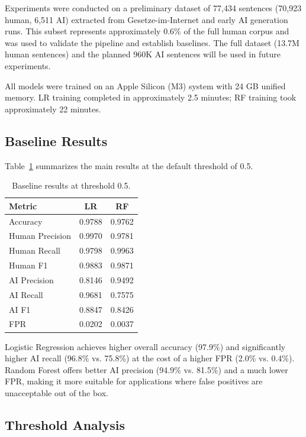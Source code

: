 \documentclass[11pt,a4paper]{article}
\begin{document}
Experiments were conducted on a preliminary dataset of 77,434 sentences (70,923 human, 6,511 AI) extracted from Gesetze-im-Internet and early AI generation runs. This subset represents approximately 0.6\% of the full human corpus and was used to validate the pipeline and establish baselines. The full dataset (13.7M human sentences) and the planned 960K AI sentences will be used in future experiments.

All models were trained on an Apple Silicon (M3) system with 24 GB unified memory. LR training completed in approximately 2.5 minutes; RF training took approximately 22 minutes.

\subsection{Baseline Results}

Table~\ref{tab:results} summarizes the main results at the default threshold of 0.5.

\begin{table}[t]
\centering
\caption{Baseline results at threshold 0.5.}
\label{tab:results}
\begin{tabular}{lcc}
\toprule
Metric & LR & RF \\
\midrule
Accuracy & 0.9788 & 0.9762 \\
Human Precision & 0.9970 & 0.9781 \\
Human Recall & 0.9798 & 0.9963 \\
Human F1 & 0.9883 & 0.9871 \\
AI Precision & 0.8146 & 0.9492 \\
AI Recall & 0.9681 & 0.7575 \\
AI F1 & 0.8847 & 0.8426 \\
FPR & 0.0202 & 0.0037 \\
\bottomrule
\end{tabular}
\end{table}

Logistic Regression achieves higher overall accuracy (97.9\%) and significantly higher AI recall (96.8\% vs. 75.8\%) at the cost of a higher FPR (2.0\% vs. 0.4\%). Random Forest offers better AI precision (94.9\% vs. 81.5\%) and a much lower FPR, making it more suitable for applications where false positives are unacceptable out of the box.

\subsection{Threshold Analysis}
\end{document}

